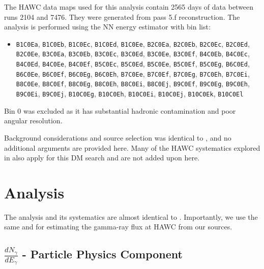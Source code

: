The HAWC data maps used for this analysis contain 2565 days of data between runs 2104 and 7476.
They were generated from pass 5.f reconstruction.
The analysis is performed using the NN energy estimator with bin list:

\begin{itemize}
    \item[] \texttt{B1C0Ea}, \texttt{B1C0Eb}, \texttt{B1C0Ec}, \texttt{B1C0Ed}, \texttt{B1C0Ee}, \texttt{B2C0Ea}, \texttt{B2C0Eb}, \texttt{B2C0Ec}, \texttt{B2C0Ed}, \texttt{B2C0Ee}, \texttt{B3C0Ea}, \texttt{B3C0Eb}, \texttt{B3C0Ec}, \texttt{B3C0Ed}, \texttt{B3C0Ee}, \texttt{B3C0Ef}, \texttt{B4C0Eb}, \texttt{B4C0Ec}, \texttt{B4C0Ed}, \texttt{B4C0Ee}, \texttt{B4C0Ef}, \texttt{B5C0Ec}, \texttt{B5C0Ed}, \texttt{B5C0Ee}, \texttt{B5C0Ef}, \texttt{B5C0Eg}, \texttt{B6C0Ed}, \texttt{B6C0Ee}, \texttt{B6C0Ef}, \texttt{B6C0Eg}, \texttt{B6C0Eh}, \texttt{B7C0Ee}, \texttt{B7C0Ef}, \texttt{B7C0Eg}, \texttt{B7C0Eh}, \texttt{B7C0Ei}, \texttt{B8C0Ee}, \texttt{B8C0Ef}, \texttt{B8C0Eg}, \texttt{B8C0Eh}, \texttt{B8C0Ei}, \texttt{B8C0Ej}, \texttt{B9C0Ef}, \texttt{B9C0Eg}, \texttt{B9C0Eh}, \texttt{B9C0Ei}, \texttt{B9C0Ej}, \texttt{B10C0Eg}, \texttt{B10C0Eh}, \texttt{B10C0Ei}, \texttt{B10C0Ej}, \texttt{B10C0Ek}, \texttt{B10C0El}
\end{itemize}
Bin 0 was excluded as it has substantial hadronic contamination and poor angular resolution.

Background considerations and source selection was identical to , and no additional arguments are provided here.
Many of the HAWC systematics explored in  also apply for this DM search and are not added upon here.

\section{Analysis}\label{sec:mtd_analysis}

The analysis and its systematics are almost identical to .
Importantly, we use the same   and  for estimating the gamma-ray flux at HAWC from our sources.

\subsection{$\frac{dN_\gamma}{dE_\gamma}$ - Particle Physics Component}\label{sec:mtd_particlephysics}

